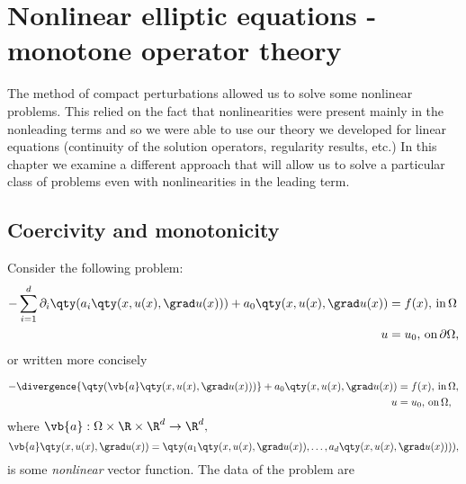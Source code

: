 
\section{Nonlinear elliptic equations - monotone operator theory}
\label{sec:monotone_operator}

The method of compact perturbations allowed us to solve some nonlinear problems. This relied on the fact that nonlinearities were present mainly in the nonleading terms and so we were able to use our theory we developed for linear equations (continuity of the solution operators, regularity results, etc.) In this chapter we examine a different approach that will allow us to solve a particular class of problems even with nonlinearities in the leading term.

\subsection{Coercivity and monotonicity}
\label{sec:coerc_monotone}
Consider the following problem:
\begin{align*}
	- \sum_{i=1}^d \partial_{i}\qty(a_i\qty(x,u(x),\grad u(x))) + a_0\qty(x,u(x),\grad u(x)) &= f(x), \, \text{in} \, \Omega \\
	u &= u_0,  \, \text{on} \, \partial \Omega,
\end{align*}
or written more concisely

\begin{align}
	\label{eq:nonlin_prob}
	- \divergence{\qty(\vb{a}\qty(x, u(x), \grad u(x)))} + a_0\qty(x, u(x), \grad u(x)) &= f(x), \, \text{in} \, \Omega, \\
	u &= u_0, \, \text{on} \, \Omega,
\end{align}
where $\vb{a}: \Omega \times \R \times \R^{d} \to \R^d,$
\[
	\vb{a}\qty(x, u(x), \grad u(x)) = \qty(a_1\qty(x, u(x), \grad u(x)), \dots, a_d\qty(x, u(x), \grad u(x)))),
\]
is some \textit{nonlinear} vector function. The data of the problem are

